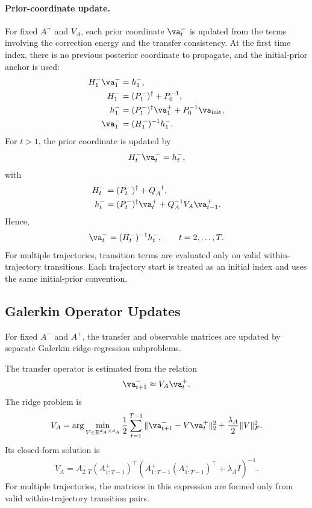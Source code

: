 \documentclass[twoside,11pt]{article}
\begin{document}
\paragraph{Prior-coordinate update.}
For fixed $A^+$ and $V_A$, each prior coordinate $\va_t^-$ is updated
from the terms involving the correction energy and the transfer
consistency. At the first time index, there is no previous posterior
coordinate to propagate, and the initial-prior anchor is used:
\begin{align}
H_1^- \va_1^-
&=
h_1^-,
\label{eq:Aminus_initial_system}
\\
H_1^-
&=
(P_1^-)^\dagger
+
P_0^{-1},
\label{eq:Aminus_initial_H}
\\
h_1^-
&=
(P_1^-)^\dagger \va_1^+
+
P_0^{-1}\va_{\mathrm{init}},
\label{eq:Aminus_initial_h}
\\
\va_1^-
&=
(H_1^-)^{-1}h_1^-.
\label{eq:Aminus_initial_update}
\end{align}
For $t>1$, the prior coordinate is updated by
\begin{align}
H_t^- \va_t^-
=
h_t^-,
\label{eq:Aminus_update_system}
\end{align}
with
\begin{align}
H_t^-
&=
(P_t^-)^\dagger
+
Q_A^{-1},
\label{eq:Aminus_update_H}
\\
h_t^-
&=
(P_t^-)^\dagger \va_t^+
+
Q_A^{-1}V_A\va_{t-1}^+.
\label{eq:Aminus_update_h}
\end{align}
Hence,
\begin{align}
\va_t^-
=
(H_t^-)^{-1}h_t^-,
\qquad
t=2,\dots,T.
\label{eq:Aminus_update_closed_form}
\end{align}
For multiple trajectories, transition terms are evaluated only on valid
within-trajectory transitions. Each trajectory start is treated as an
initial index and uses the same initial-prior convention.

\subsection{Galerkin Operator Updates}

For fixed $A^-$ and $A^+$, the transfer and observable matrices are
updated by separate Galerkin ridge-regression subproblems.

The transfer operator is estimated from the relation
\begin{align}
\va_{t+1}^-
\approx
V_A\va_t^+.
\end{align}
The ridge problem is
\begin{align}
V_A
=
\arg\min_{V\in\mathbb R^{d_A\times d_A}}
\frac12
\sum_{t=1}^{T-1}
\|\va_{t+1}^- - V\va_t^+\|_2^2
+
\frac{\lambda_A}{2}
\|V\|_F^2.
\label{eq:VA_operator_subproblem_revised}
\end{align}
Its closed-form solution is
\begin{align}
V_A
=
A_{2:T}^-
(A_{1:T-1}^+)^\top
\left(
A_{1:T-1}^+
(A_{1:T-1}^+)^\top
+
\lambda_A I
\right)^{-1}.
\label{eq:VA_closed_form_revised}
\end{align}
For multiple trajectories, the matrices in this expression are formed
only from valid within-trajectory transition pairs.
\end{document}
